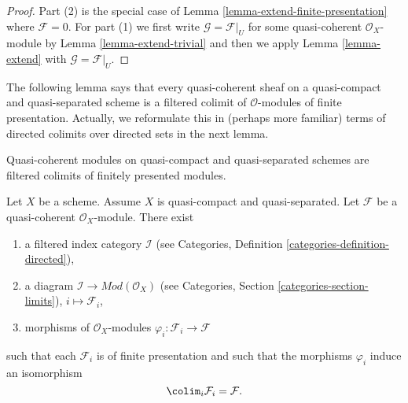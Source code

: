\begin{proof}
Part (2) is the special case of Lemma \ref{lemma-extend-finite-presentation}
where $\mathcal{F} = 0$. For part (1) we first write
$\mathcal{G} = \mathcal{F}|_U$ for some quasi-coherent $\mathcal{O}_X$-module
by Lemma \ref{lemma-extend-trivial}
and then we apply Lemma \ref{lemma-extend} with $\mathcal{G} = \mathcal{F}|_U$.
\end{proof}

\noindent
The following lemma says that every quasi-coherent sheaf on a quasi-compact
and quasi-separated scheme is a filtered colimit of $\mathcal{O}$-modules
of finite presentation. Actually, we reformulate this in (perhaps more
familiar) terms of directed colimits over directed sets in the next lemma.

\begin{lemma}
\label{lemma-directed-colimit-diagram-finite-presentation}
\begin{slogan}
Quasi-coherent modules on quasi-compact and quasi-separated schemes
are filtered colimits of finitely presented modules.
\end{slogan}
Let $X$ be a scheme. Assume $X$ is quasi-compact and quasi-separated.
Let $\mathcal{F}$ be a quasi-coherent $\mathcal{O}_X$-module.
There exist
\begin{enumerate}
\item a filtered index category $\mathcal{I}$ (see
Categories, Definition \ref{categories-definition-directed}),
\item a diagram $\mathcal{I} \to \textit{Mod}(\mathcal{O}_X)$ (see
Categories, Section \ref{categories-section-limits}),
$i \mapsto \mathcal{F}_i$,
\item morphisms of $\mathcal{O}_X$-modules
$\varphi_i : \mathcal{F}_i \to \mathcal{F}$
\end{enumerate}
such that each $\mathcal{F}_i$ is of finite presentation
and such that the morphisms $\varphi_i$ induce an isomorphism
$$
\colim_i \mathcal{F}_i
=
\mathcal{F}.
$$
\end{lemma}

